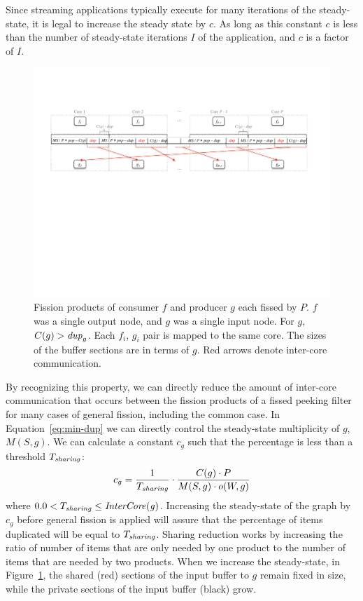Since streaming applications typically execute for many iterations of
the steady-state, it is legal to increase the steady state by $c$.  As
long as this constant $c$ is less than the number of steady-state
iterations $I$ of the application, and $c$ is a factor of $I$.


\begin{figure}[t]
\centering
\includegraphics[width=6in]{figures/remaining-dup-case.pdf}
\caption[Extra inter-core communication when $C(g) > \mt{dup}_g$.]
{Fission products of consumer $f$
  and producer $g$ each fissed by $P$.  $f$ was a single output node,
  and $g$ was a single input node.  For $g$, $C(g) > \mt{dup}_g$.
  Each $f_i$, $g_i$ pair is mapped to the same core.  The sizes of
  the buffer sections are in terms of $g$. Red arrows denote
  inter-core communication.  \label{fig:remaining-dup}}
\vspace{-10pt}
\end{figure}


By recognizing this property, we can directly reduce the amount of
inter-core communication that occurs between the fission products of a
fissed peeking filter for many cases of general fission, including the
common case.  In Equation~\ref{eq:min-dup} we can directly control the
steady-state multiplicity of $g$, $M(S,g)$.  We can calculate a
constant $c_g$ such that the percentage is less than a threshold
$T_{\relax{\it sharing}}$:
{\ninepoint
\begin{equation}
\label{eq:ic-thresh}
c_g = \frac{1}{T_{\mt{sharing}}} \cdot \frac{C(g) \cdot P}{M(S,g) \cdot o(W,g)}
\end{equation}
}
\noindent where $0.0 < T_{\relax{\it sharing}} \le
\relax{\it InterCore(g)}$. Increasing the steady-state of the graph by $c_g$
before general fission is applied will assure that the percentage of
items duplicated will be equal to $T_{\relax{\it sharing}}$.  Sharing
reduction works by increasing the ratio of number of items that are
only needed by one product to the number of items that are needed by
two products.  When we increase the steady-state, in
Figure~\ref{fig:remaining-dup}, the shared (red) sections of the input
buffer to $g$ remain fixed in size, while the private sections of the
input buffer (black) grow.

